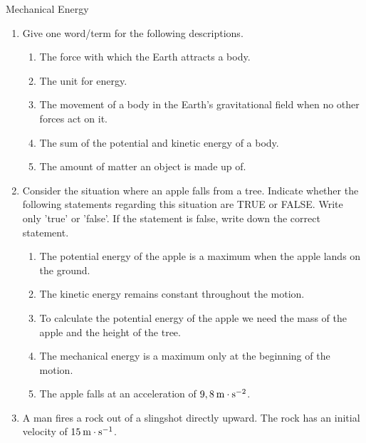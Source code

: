 \begin{eocexercises}{Mechanical Energy}
            \nopagebreak
      \label{m38786*id71520}\begin{enumerate}[noitemsep, label=\textbf{\arabic*}. ] 
            \label{m38786*uid118}\item Give one word/term for the following descriptions.
\label{m38786*id71536}\begin{enumerate}[noitemsep, label=\textbf{\alph*}. ] 
            \label{m38786*uid119}\item The force with which the Earth attracts a body.
\label{m38786*uid120}\item The unit for energy.
\label{m38786*uid121}\item The movement of a body in the Earth's gravitational field when no other forces act on it.
\label{m38786*uid122}\item The sum of the potential and kinetic energy of a body.
\label{m38786*uid123}\item The amount of matter an object is made up of.
\end{enumerate}
                \label{m38786*uid124}\item Consider the situation where an apple falls from a tree. Indicate whether the following statements regarding this situation are TRUE or FALSE. Write only 'true' or 'false'. If the statement is false, write down the correct statement.
\label{m38786*id71616}\begin{enumerate}[noitemsep, label=\textbf{\alph*}. ] 
            \label{m38786*uid125}\item The potential energy of the apple is a maximum when the apple lands on the ground.
\label{m38786*uid126}\item The kinetic energy remains constant throughout the motion.
\label{m38786*uid127}\item To calculate the potential energy of the apple we need the mass of the apple and the height of the tree.
\label{m38786*uid128}\item The mechanical energy is a maximum only at the beginning of the motion.
\label{m38786*uid129}\item The apple falls at an acceleration of $9,8\phantom{\rule{2pt}{0ex}}\text{m}\ensuremath{\cdot}\text{s}{}^{-2}$.
\end{enumerate}
                \label{m38786*uid131}\item A man fires a rock out of a slingshot directly upward. The rock has an initial velocity of $15\phantom{\rule{2pt}{0ex}}\text{m}\ensuremath{\cdot}\text{s}{}^{-1}$.

\end{enumerate}
\end{eocexercises}
